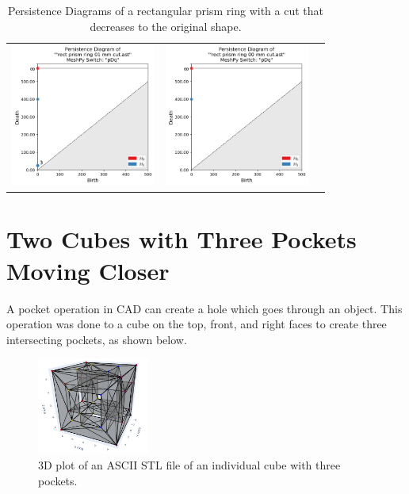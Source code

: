 \documentclass[ma]{uncgdissertationexp}
\theoremstyle{plain}
\theoremstyle{definition}
\theoremstyle{remark}
\begin{document}
\begin{table}[H]
\begin{center}
\begin{tabular}{ccc}
         \includegraphics[width=1.875in]{Final Run, (rect prism ring 01 mm cut) persdia.png} &
         \includegraphics[width=1.875in]{Final Run, (rect prism ring 00 mm cut) persdia.png} \\
    \end{tabular}
    \end{center}
    \caption{Persistence Diagrams of a rectangular prism ring with a cut that decreases to the original shape.}
    \label{fig:rect_prism_ring_persdia_table}
\end{table}

\newpage
\section{Two Cubes with Three Pockets Moving Closer}
A pocket operation in CAD can create a hole which goes through an object. This operation was done to a cube on the top, front, and right faces to create three intersecting pockets, as shown below.
\begin{figure}[H]
\begin{center}
	\includegraphics[height=1.25in]{one cube three pockets each.png}
    \caption{3D plot of an ASCII STL file of an individual cube with three pockets.}
\label{fig:ast_tetrahedrons}
\end{center}
\end{figure}
\end{document}
